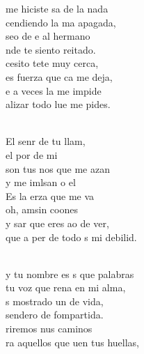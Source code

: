 \begin{cancion}%
	 me hiciste sa de la nada \\
	cendiendo la ma apagada,\\
	seo de e al hermano\\
	nde te siento reitado.\\
\jump
	cesito tete muy cerca,\\
	es fuerza que ca me deja,\\
	e a veces la  me impide\\
	alizar todo lue me pides.\\\jump\\
	\begin{chorus}%
	El senr de tu llam,\\
	el por de mi\\
	son tus nos que me azan\\
	y me imlsan o el \\
	Es la erza que me va\\
	oh,  amsin coones\\
	y sar que eres ao de ver,\\
	que a per de todo s mi debilid.\\
	\end{chorus}%
	\jump\\
	y tu nombre es s que palabras\\
	 tu voz que rena en mi alma,\\
	s mostrado un  de vida,\\
	 sendero de fompartida.\\
\jump
	riremos nus caminos \\
	ra aquellos que uen tus huellas,\\

\end{cancion}
